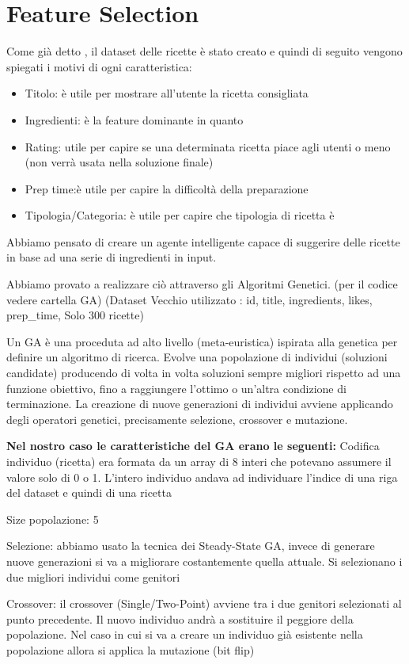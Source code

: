 \documentclass[12pt]{report}
\begin{document}
\section{Feature Selection}
Come già detto , il dataset delle ricette è stato creato e quindi di seguito vengono spiegati i motivi di ogni caratteristica:
\begin{itemize}
	\item Titolo: è utile per mostrare all’utente la ricetta consigliata 
	\item Ingredienti: è la feature dominante in quanto
	\item Rating: utile per capire se una determinata ricetta piace agli utenti o meno (non verrà usata nella soluzione finale)
	\item Prep time:è utile per capire la difficoltà della preparazione
	\item Tipologia/Categoria: è utile per capire che tipologia di ricetta è
 \end{itemize}

Abbiamo pensato di creare un agente intelligente capace di suggerire delle ricette in base ad una serie di ingredienti in input.

Abbiamo provato a realizzare ciò attraverso gli Algoritmi Genetici. (per il codice vedere cartella GA) (Dataset Vecchio utilizzato : id, title, ingredients, likes, prep\_time, Solo 300 ricette)

Un GA è una proceduta ad alto livello (meta-euristica) ispirata alla genetica per definire un algoritmo di ricerca. Evolve una popolazione di individui (soluzioni candidate) producendo di volta in volta soluzioni sempre migliori rispetto ad una funzione obiettivo, fino a raggiungere l’ottimo o un’altra condizione di terminazione. La creazione di nuove generazioni di individui avviene applicando degli operatori genetici, precisamente selezione, crossover e mutazione.

\textbf{Nel nostro caso le caratteristiche del GA erano le seguenti:}
Codifica individuo (ricetta) era formata da un array di 8 interi che potevano assumere il valore solo di 0 o 1. L’intero individuo andava ad individuare l’indice di una riga del dataset e quindi di una ricetta

Size popolazione: 5

Selezione: abbiamo usato la tecnica dei Steady-State GA, invece di generare nuove generazioni si va a migliorare costantemente quella attuale. Si selezionano i due migliori individui come genitori

Crossover: il crossover (Single/Two-Point) avviene tra i due genitori selezionati al punto precedente. Il nuovo individuo andrà a sostituire il peggiore della popolazione. Nel caso in cui si va a creare un individuo già esistente nella popolazione allora si applica la mutazione (bit flip)
\end{document}
